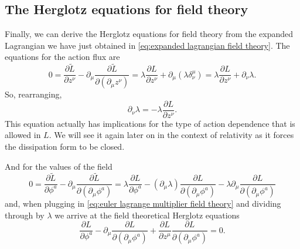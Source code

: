 \documentclass[../main.tex]{subfiles}
\begin{document}
\subsection{The Herglotz equations for field theory}
Finally, we can derive the Herglotz equations for field theory from the expanded
Lagrangian we have just obtained in \cref{eq:expanded lagrangian field theory}. The
equations for the action flux are
\begin{equation*}
	0 = \frac{\partial \tilde{L}}{\partial z^\nu} - \partial_\mu \frac{\partial
	\tilde{L}}{\partial(\partial_\mu z^\nu)} = \lambda \frac{\partial L}{\partial z^\nu} +
	\partial_\mu(\lambda \delta_\nu^\mu) = \lambda \frac{\partial L}{\partial z^\nu} +
	\partial_\nu \lambda.
\end{equation*}
So, rearranging,
\begin{equation} \label{eq:euler lagrange multiplier field theory}
	\partial_\nu \lambda = - \lambda \frac{\partial L}{\partial z^\nu}. 
\end{equation}
This equation actually has implications for the type of action dependence that is allowed
in \( L \). We will see it again later on in the context of relativity as it forces the
dissipation form to be closed. 

And for the values of the field
\begin{equation*}
	0 = \frac{\partial \tilde{L}}{\partial \phi^a} - \partial_\mu \frac{\partial
	\tilde{L}}{\partial(\partial_\mu \phi^a)} = \lambda \frac{\partial L}{\partial \phi^a} -
	(\partial_\mu \lambda) \frac{\partial L}{\partial (\partial_\mu \phi^a) } - \lambda
	\partial_\mu \frac{\partial L}{\partial (\partial_\mu \phi^a) }
\end{equation*}
and, when plugging in \cref{eq:euler lagrange multiplier field theory} and dividing
through by \( \lambda \) we arrive at the field theoretical Herglotz equations
\begin{equation} \label{eq:herglotz field theory}
	\frac{\partial L}{\partial \phi^a} - \partial_\mu \frac{\partial
	L}{\partial(\partial_\mu \phi^a)} + \frac{\partial L}{\partial z^\mu} \frac{\partial
L}{\partial(\partial_\mu \phi^a)} = 0. 
\end{equation}
\end{document}
